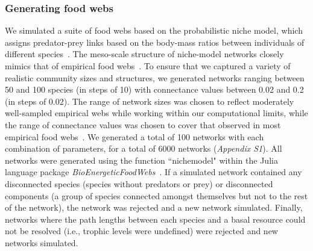 \documentclass[12pt]{article}
\begin{document}
\begin{spacing}{2.0}
    	\subsubsection*{Generating food webs}
    
    		We simulated a suite of food webs based on the probabilistic niche model, which assigns predator-prey links based on the body-mass ratios between individuals of different species~\citep{Williams2000,Delmas2017}. The meso-scale structure of niche-model networks closely mimics that of empirical food webs~\citep{Stouffer2007}. To ensure that we captured a variety of realistic community sizes and structures, we generated networks ranging between 50 and 100 species (in steps of 10) with connectance values between 0.02 and 0.2 (in steps of 0.02). The range of network sizes was chosen to reflect moderately well-sampled empirical webs while working within our computational limits, while the range of connectance values was chosen to cover that observed in most empirical food webs~\citep{Dunne2002}. We generated a total of 100 networks with each combination of parameters, for a total of 6000 networks (\emph{Appendix S1}). All networks were generated using the function ``nichemodel" within the Julia language package \emph{BioEnergeticFoodWebs}~\citep{bioenergeticfw,Delmas2017}. If a simulated network contained any disconnected species (species without predators or prey) or disconnected components (a group of species connected amongst themselves but not to the rest of the network), the network was rejected and a new network simulated. Finally, networks where the path lengths between each species and a basal resource could not be resolved (i.e., trophic levels were undefined) were rejected and new networks simulated.
    

\end{spacing}
\end{document}
